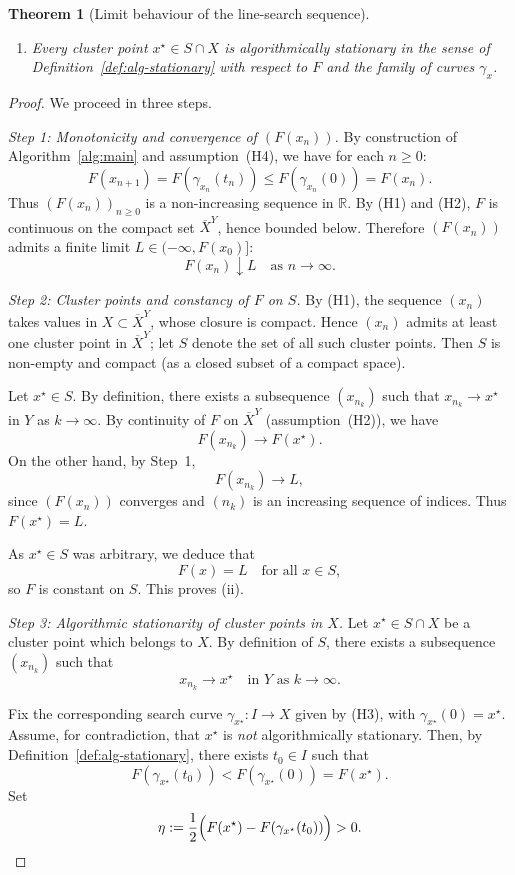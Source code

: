\documentclass{amsart}
\newcounter{thm}
\newcounter{ex}
\newcounter{re}
\newtheorem{Theorem}[thm]{Theorem}
\begin{document}
{\begin{Theorem}[Limit behaviour of the line-search sequence]
\begin{enumerate}
  \item[(iii)] Every cluster point $x^\star\in S\cap X$ is algorithmically stationary
  in the sense of Definition~\ref{def:alg-stationary} with respect to $F$ and the
  family of curves $\gamma_x$.
\end{enumerate}
\end{Theorem}
\begin{proof}
We proceed in three steps.

\medskip
\noindent\emph{Step 1: Monotonicity and convergence of $(F(x_n))$.}
By construction of Algorithm~\ref{alg:main} and assumption~(H4), we have
for each $n\geq 0$:
\[
F(x_{n+1}) = F(\gamma_{x_n}(t_n)) 
\leq F(\gamma_{x_n}(0)) 
= F(x_n).
\]
Thus $(F(x_n))_{n\geq 0}$ is a non-increasing sequence in $\mathbb{R}$.
By (H1) and (H2), $F$ is continuous on the compact set $\overline{X}^Y$, hence bounded below.
Therefore $(F(x_n))$ admits a finite limit $L\in(-\infty,F(x_0)]$:
\[
F(x_n) \downarrow L \quad \text{as } n\to\infty.
\]

\medskip
\noindent\emph{Step 2: Cluster points and constancy of $F$ on $S$.}
By (H1), the sequence $(x_n)$ takes values in $X\subset\overline{X}^Y$, whose closure is compact.
Hence $(x_n)$ admits at least one cluster point in $\overline{X}^Y$; let $S$ denote the set
of all such cluster points. Then $S$ is non-empty and compact (as a closed subset of a compact
space).

Let $x^\star\in S$. By definition, there exists a subsequence $(x_{n_k})$ such that
$x_{n_k}\to x^\star$ in $Y$ as $k\to\infty$. By continuity of $F$ on $\overline{X}^Y$ (assumption~(H2)),
we have
\[
F(x_{n_k}) \longrightarrow F(x^\star).
\]
On the other hand, by Step~1,
\[
F(x_{n_k}) \longrightarrow L,
\]
since $(F(x_n))$ converges and $(n_k)$ is an increasing sequence of indices.
Thus $F(x^\star) = L$.

As $x^\star\in S$ was arbitrary, we deduce that
\[
F(x) = L \quad \text{for all } x\in S,
\]
so $F$ is constant on $S$. This proves (ii).

\medskip
\noindent\emph{Step 3: Algorithmic stationarity of cluster points in $X$.}
Let $x^\star\in S\cap X$ be a cluster point which belongs to $X$.
By definition of $S$, there exists a subsequence $(x_{n_k})$ such that
\[
x_{n_k} \longrightarrow x^\star \quad \text{in } Y \text{ as } k\to\infty.
\]

Fix the corresponding search curve $\gamma_{x^\star}:I\to X$ given by (H3), 
with $\gamma_{x^\star}(0)=x^\star$.
Assume, for contradiction, that $x^\star$ is \emph{not} algorithmically stationary.
Then, by Definition~\ref{def:alg-stationary}, there exists $t_0\in I$ such that
\[
F(\gamma_{x^\star}(t_0)) < F(\gamma_{x^\star}(0)) = F(x^\star).
\]
Set
\[
\eta := \frac{1}{2}\Bigl(F(x^\star) - F(\gamma_{x^\star}(t_0))\Bigr) > 0.
\]


\end{proof}}
\end{document}
